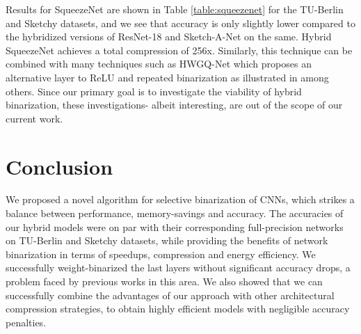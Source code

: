 \documentclass[10pt,twocolumn,letterpaper]{article}
\begin{document}
Results for SqueezeNet are shown in Table \ref{table:squeezenet} for the TU-Berlin and Sketchy datasets, and we see that accuracy is only slightly lower compared to the hybridized versions of ResNet-18 and Sketch-A-Net on the same. Hybrid SqueezeNet achieves a total compression of 256x. Similarly, this technique can be combined with many techniques such as HWGQ-Net \cite{cai2017deep} which proposes an alternative layer to ReLU and repeated binarization as illustrated in \cite{tang2017train} among others. Since our primary goal is to investigate the viability of hybrid binarization, these investigations- albeit interesting, are out of the scope of our current work.

\section{Conclusion}
We proposed a novel algorithm for selective binarization of CNNs, which strikes a balance between performance, memory-savings and accuracy. The accuracies of our hybrid models were on par with their corresponding full-precision networks on TU-Berlin and Sketchy datasets, while providing the benefits of network binarization in terms of speedups, compression and energy efficiency. We successfully weight-binarized the last layers without significant accuracy drops, a problem faced by previous works in this area. We also showed that we can successfully combine the advantages of our approach with other architectural compression strategies, to obtain highly efficient models with negligible accuracy penalties. 


\cleardoublepage{\small


}
\end{document}
